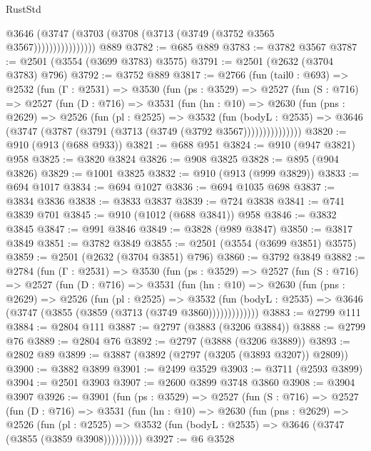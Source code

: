 \begin{lexlean}{RustStd}
\begin{coremodule}
{\begin{coremodule}
{{{{{{{{{{{{{{{{{{{{                      @3646 (@3747 (@3703 (@3708 (@3713 (@3749 (@3752 @3565 @3567))))))))))))))))
    @889
@3782 := @685 @889
@3783 := @3782 @3567
@3787 := @2501 (@3554 (@3699 @3783) @3575)
@3791 := @2501 (@2632 (@3704 @3783) @796)
@3792 := @3752 @889
@3817 := @2766
    (fun (tail0 : @693) =>
    @2532
      (fun (Γ : @2531) =>
      @3530
        (fun (ps : @3529) =>
        @2527
          (fun (S : @716) =>
          @2527
            (fun (D : @716) =>
            @3531
              (fun (hn : @10) =>
              @2630
                (fun (pns : @2629) =>
                @2526
                  (fun (pl : @2525) =>
                  @3532
                    (fun (bodyL : @2535) =>
                    @3646 (@3747 (@3787 (@3791 (@3713 (@3749 (@3792 @3567)))))))))))))))
@3820 := @910 (@913 (@688 @933))
@3821 := @688 @951
@3824 := @910 (@947 @3821) @958
@3825 := @3820 @3824
@3826 := @908 @3825
@3828 := @895 (@904 @3826)
@3829 := @1001 @3825
@3832 := @910 (@913 (@999 @3829))
@3833 := @694 @1017
@3834 := @694 @1027
@3836 := @694 @1035 @698
@3837 := @3834 @3836
@3838 := @3833 @3837
@3839 := @724 @3838
@3841 := @741 @3839 @701
@3845 := @910 (@1012 (@688 @3841)) @958
@3846 := @3832 @3845
@3847 := @991 @3846
@3849 := @3828 (@989 @3847)
@3850 := @3817 @3849
@3851 := @3782 @3849
@3855 := @2501 (@3554 (@3699 @3851) @3575)
@3859 := @2501 (@2632 (@3704 @3851) @796)
@3860 := @3792 @3849
@3882 := @2784
    (fun (Γ : @2531) =>
    @3530
      (fun (ps : @3529) =>
      @2527
        (fun (S : @716) =>
        @2527
          (fun (D : @716) =>
          @3531
            (fun (hn : @10) =>
            @2630
              (fun (pns : @2629) =>
              @2526
                (fun (pl : @2525) =>
                @3532
                  (fun (bodyL : @2535) =>
                  @3646 (@3747 (@3855 (@3859 (@3713 (@3749 @3860)))))))))))))
@3883 := @2799 @111
@3884 := @2804 @111
@3887 := @2797 (@3883 (@3206 @3884))
@3888 := @2799 @76
@3889 := @2804 @76
@3892 := @2797 (@3888 (@3206 @3889))
@3893 := @2802 @89
@3899 := @3887 (@3892 (@2797 (@3205 (@3893 @3207)) @2809))
@3900 := @3882 @3899
@3901 := @2499 @3529
@3903 := @3711 (@2593 @3899)
@3904 := @2501 @3903
@3907 := @2600 @3899 @3748 @3860
@3908 := @3904 @3907
@3926 := @3901
    (fun (ps : @3529) =>
    @2527
      (fun (S : @716) =>
      @2527
        (fun (D : @716) =>
        @3531
          (fun (hn : @10) =>
          @2630
            (fun (pns : @2629) =>
            @2526
              (fun (pl : @2525) =>
              @3532 (fun (bodyL : @2535) => @3646 (@3747 (@3855 (@3859 @3908))))))))))
@3927 := @6 @3528
}}}}}}}}}}}}}}}}}}}}
\end{coremodule}}
\end{coremodule}
\end{lexlean}
